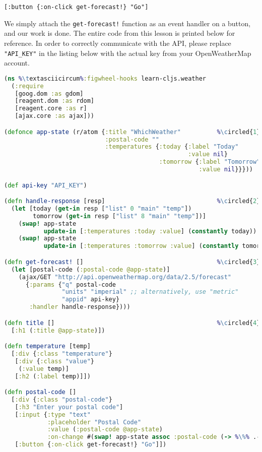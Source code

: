 \documentclass[10pt,twoside,openright]{memoir}
\newcommand*\circled[1]{\tikz[baseline=(char.base)]{
            \node[shape=circle,draw,inner sep=1pt] (char) {#1};}}
\begin{document}
\begin{verbatim}
[:button {:on-click get-forecast!} "Go"]
\end{verbatim}

We simply attach the \texttt{get-forecast!} function as an event handler
on a button, and our work is done. The entire code from this lesson is
printed below for reference. In order to correctly communicate with the
API, please replace \texttt{"API\_KEY"} in the listing below with the
actual key from your OpenWeatherMap account.

\begin{lstlisting}[language=Clojure, caption={Complete weather forecasting app}]
(ns %\textasciicircum%:figwheel-hooks learn-cljs.weather
  (:require
   [goog.dom :as gdom]
   [reagent.dom :as rdom]
   [reagent.core :as r]
   [ajax.core :as ajax]))

(defonce app-state (r/atom {:title "WhichWeather"          %\circled{1}%
                            :postal-code ""
                            :temperatures {:today {:label "Today"
                                                   :value nil}
                                           :tomorrow {:label "Tomorrow"
                                                      :value nil}}}))

(def api-key "API_KEY")

(defn handle-response [resp]                               %\circled{2}%
  (let [today (get-in resp ["list" 0 "main" "temp"])
        tomorrow (get-in resp ["list" 8 "main" "temp"])]
    (swap! app-state
           update-in [:temperatures :today :value] (constantly today))
    (swap! app-state
           update-in [:temperatures :tomorrow :value] (constantly tomorrow))))

(defn get-forecast! []                                     %\circled{3}%
  (let [postal-code (:postal-code @app-state)]
    (ajax/GET "http://api.openweathermap.org/data/2.5/forecast"
      {:params {"q" postal-code
                "units" "imperial" ;; alternatively, use "metric"
                "appid" api-key}
       :handler handle-response})))

(defn title []                                             %\circled{4}%
  [:h1 (:title @app-state)])

(defn temperature [temp]
  [:div {:class "temperature"}
   [:div {:class "value"}
    (:value temp)]
   [:h2 (:label temp)]])

(defn postal-code []
  [:div {:class "postal-code"}
   [:h3 "Enter your postal code"]
   [:input {:type "text"
            :placeholder "Postal Code"
            :value (:postal-code @app-state)
            :on-change #(swap! app-state assoc :postal-code (-> %\%% .-target .-value))}]
   [:button {:on-click get-forecast!} "Go"]])


\end{lstlisting}
\end{document}
